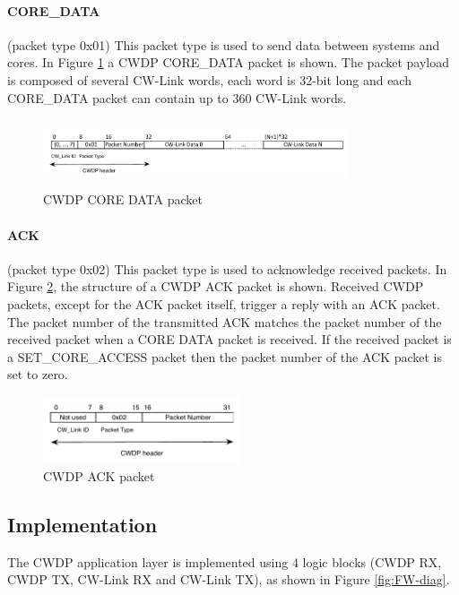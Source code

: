 \documentclass[conference]{IEEEtran}
\begin{document}
\paragraph*{CORE\_DATA} (packet type 0x01) This packet type is used to send data between systems and cores. In Figure \ref{fig:cwdp-data} a CWDP CORE\_DATA packet is shown. The packet payload is composed of several CW-Link words, each word is 32-bit long and each CORE\_DATA packet can contain up to 360 CW-Link words.

\begin{figure}[h]
  \centering
      \includegraphics[width=9cm,height=2cm]{Diagrams/CWDP_Core_data_paper.pdf}
  \caption{CWDP CORE DATA packet}
  \label{fig:cwdp-data}
\end{figure}

\paragraph*{ACK} (packet type 0x02) This packet type is used to acknowledge received packets. In Figure \ref{fig:cwdp-ack}, the structure of a CWDP ACK packet is shown. Received CWDP packets, except for the ACK packet itself, trigger a reply with an ACK packet. The packet number of the transmitted ACK matches the packet number of the received packet when a CORE DATA packet is received. If the received packet is a SET\_CORE\_ACCESS packet then the packet number of the ACK packet is set to zero.

\begin{figure}[h]
  \centering
      \includegraphics[height=2cm]{Diagrams/CWDP-Ack.pdf}
  \caption{CWDP ACK packet}
  \label{fig:cwdp-ack}
\end{figure}

\subsection{Implementation}

The CWDP application layer is implemented using 4 logic blocks (CWDP RX, CWDP TX, CW-Link RX and CW-Link TX), as shown in Figure \ref{fig:FW-diag}.
\end{document}
